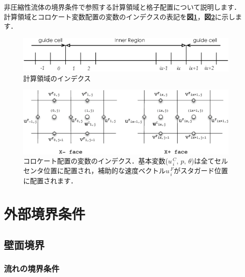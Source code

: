 非圧縮性流体の境界条件で参照する計算領域と格子配置について説明します．
計算領域とコロケート変数配置の変数のインデクスの表記を\textbf{図\ref{fig:index_domain}}，\textbf{図\ref{fig:index_cc}}に示します．

\begin{figure}[htdp]
  \begin{center}
  \includegraphics[width=12cm,clip]{index_domain.eps}
  \end{center}
  \caption{計算領域のインデクス}
  \label{fig:index_domain}
\end{figure}

\begin{figure}[htdp]
  \begin{center}
  \includegraphics[width=14cm,clip]{index_cc.eps}
  \end{center}
  \caption{コロケート配置の変数のインデクス．基本変数($u_{\,i}^{\,C},\, p,\,\theta$)は全てセルセンタ位置に配置され，補助的な速度ベクトル$u_{\,i}^{\,F}$がスタガード位置に配置されます．}
  \label{fig:index_cc}
\end{figure}


\pagebreak
\section{外部境界条件}

%
\subsection{壁面境界}

\subsubsection{流れの境界条件}

